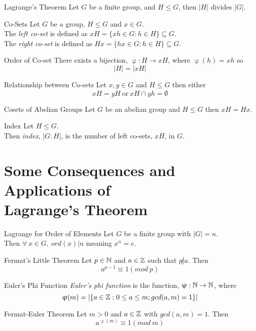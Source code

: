 \documentclass[11pt,a4paper]{article}
\begin{document}
\subtitle{Theorem 11.01 - }{Lagrange's Theorem}
Let $G$ be a finite group, and $H \leq G$, then $|H|$ divides $|G|$.\\

\subtitle{Definition 11.02 - }{Co-Sets}
Let $G$ be a group, $H \leq G$ and $x \in G$.\\
The \textit{left co-set} is defined as $xH = \{xh \in G : h \in H\} \subseteq G$.\\
The \textit{right co-set} is defined as $Hx = \{hx \in G : h \in H\} \subseteq G$.\\

\subtitle{Theorem 11.03 - }{Order of Co-set}
There exists a bijection, $\upvarphi : H \to xH$, where $\upvarphi(h) = xh$ so $$|H| = |xH|$$

\subtitle{Theorem 11.04 - }{Relationship between Co-sets}
Let $x, y \in G$ and $H \leq G$ then either
$$xH = yH \mathrm{\ or\ } xH \cap yh = \emptyset$$

\subtitle{Theorem 11.05 - }{Cosets of Abelian Groups}
Let $G$ be an abelian group and $H \leq G$ then $xH = Hx$.\\

\subtitle{Definition 11.06 - }{Index}
Let $H \leq G$.\\
Then \textit{index}, $|G : H|$, is the number of left co-sets, $xH$, in $G$.

\section{Some Consequences and Applications of\\ Lagrange's Theorem}

\subtitle{Propostion 12.01 - }{Lagrange for Order of Elements}
Let $G$ be a finite group with $|G| = n$.\\
Then $\forall\ x \in G,\ ord(x) | n$ meaning $x^n = e$.\\

\subtitle{Theorem 12.02 - }{Fermat's Little Theorem}
Let $p \in \mathbb{N}$ and $a \in \mathbb{Z}$ such that $p \not | a$. Then
$$a^{p-1} \equiv 1 (mod\ p)$$

\subtitle{Definition 12.03 - }{Euler's Phi Function}
\textit{Euler's phi function} is the function, $\upvarphi : \mathbb{N} \to \mathbb{N}$, where
$$\upvarphi(m) = |\{ a \in \mathbb{Z} : 0 \leq a \leq m; gcd(a, m) = 1 \}|$$

\subtitle{Theorem 12.04 - }{Fermat-Euler Theorem}
Let $m > 0$ and $a \in \mathbb{Z}$ with $gcd(a, m) = 1$. Then
$$a^{\upvarphi(m)} \equiv 1 (mod\ m)$$
\end{document}
